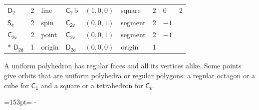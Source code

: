 \documentclass[10pt,a4paper]{article}
\newcommand{\needspace}[1]{\par\penalty-100\begingroup\dimen0=#1\relax\dimen2=\pagegoal
  \advance\dimen2-\pagetotal\ifdim\dimen0>\dimen2\relax\ifdim\dimen2>0pt\vfil\break\fi\fi
  \endgroup}
\numberwithin{equation}{section}
\newcommand{\grp}[1]{\mathsf{#1}}
\newcommand{\clsletter}[1]{\,{\scriptsize\color{black!55}#1}}
\newlength{\fillwidth}\newlength{\cellwidth}\newlength{\colwidth}
\begin{document}
{{\begin{longtable}{@{}lrllllr>{\RaggedRight\arraybackslash}p{\fillwidth}r@{}}
\href{D2.pdf}{$\grp{D_{2}}$} & 2 & line & \href{C2.pdf}{$\grp{C_{2}}$}\clsletter{b} & $(1, 0, 0)$ & square & 2 & ${0}$ & 2\\
\href{S4.pdf}{$\grp{S_{4}}$} & 2 & spin & \href{C2v.pdf}{$\grp{C_{2v}}$} & $(0, 0, 1)$ & segment & 2 & ${-1}$ & \\
\href{C2v.pdf}{$\grp{C_{2v}}$} & 2 & point & \href{C2v.pdf}{$\grp{C_{2v}}$} & $(0, 0, 1)$ & segment & 2 & ${-1}$ & \\*
\href{D2d.pdf}{$\grp{D_{2d}}$} & 1 & origin & \href{D2d.pdf}{$\grp{D_{2d}}$} & $(0, 0, 0)$ & origin & 1 &  & \\
\bottomrule\end{longtable}}}
A uniform polyhedron has regular faces and all its vertices alike. Some points give orbits that are uniform polyhedra or regular polygons: a regular octagon or a cube for \href{C1.pdf}{$\grp{C_{1}}$} and a square or a tetrahedron for \href{C1v.pdf}{$\grp{C_{s}}$}.
\needspace{153pt}
\end{document}
